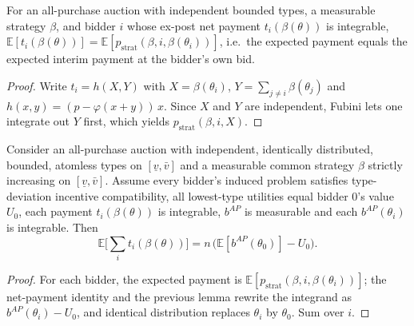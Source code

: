 \begin{lemma}\label{thm:MathEconLib.Auction.integral_t_i_eq_integral_p_strat}
\leanok
{}
For an all-purchase auction with independent bounded types, a measurable strategy $\beta$, and bidder $i$ whose ex-post net payment $t_i(\beta(\theta))$ is integrable, $\mathbb E[t_i(\beta(\theta))] = \mathbb E[p_{\mathrm{strat}}(\beta, i, \beta(\theta_i))]$, i.e.\ the expected payment equals the expected interim payment at the bidder's own bid.
\end{lemma}
\begin{proof}
\leanok
{}
Write $t_i = h(X, Y)$ with $X = \beta(\theta_i)$, $Y = \sum_{j \ne i}\beta(\theta_j)$ and $h(x,y) = (p - \varphi(x+y))\,x$. Since $X$ and $Y$ are independent, Fubini lets one integrate out $Y$ first, which yields $p_{\mathrm{strat}}(\beta,i,X)$.
\end{proof}

\begin{lemma}\label{thm:MathEconLib.Auction.expectedNetPayment_eq}
\leanok
{}
Consider an all-purchase auction with independent, identically distributed, bounded, atomless types on $[\underline v,\bar v]$ and a measurable common strategy $\beta$ strictly increasing on $[\underline v,\bar v]$. Assume every bidder's induced problem satisfies type-deviation incentive compatibility, all lowest-type utilities equal bidder $0$'s value $U_0$, each payment $t_i(\beta(\theta))$ is integrable, $b^{AP}$ is measurable and each $b^{AP}(\theta_i)$ is integrable. Then
\[
  \mathbb E\Big[\sum_i t_i(\beta(\theta))\Big] = n\,\big(\mathbb E[b^{AP}(\theta_0)] - U_0\big).
\]
\end{lemma}
\begin{proof}
\leanok
{}
For each bidder, the expected payment is $\mathbb E[p_{\mathrm{strat}}(\beta,i,\beta(\theta_i))]$; the net-payment identity and the previous lemma rewrite the integrand as $b^{AP}(\theta_i) - U_0$, and identical distribution replaces $\theta_i$ by $\theta_0$. Sum over $i$.
\end{proof}

